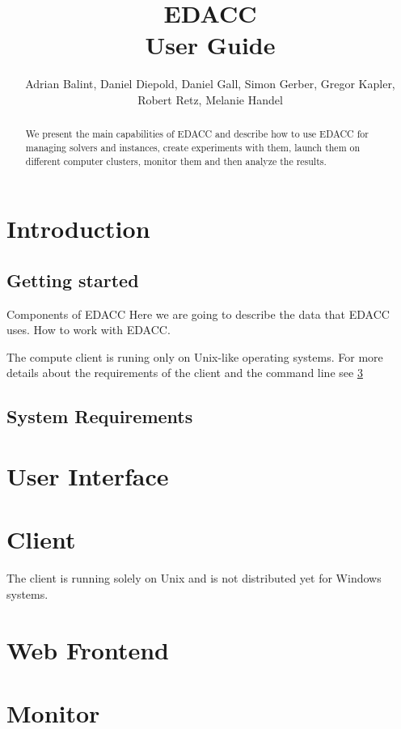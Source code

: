 \documentclass[twoside,a4paper]{refart}
\title{EDACC \\ %
User Guide	
}
\author{Adrian Balint, Daniel Diepold, Daniel Gall, Simon Gerber, Gregor Kapler, Robert Retz, Melanie Handel }
\date{}
\begin{document}
\maketitle

\begin{abstract}
        We present the main capabilities of EDACC and describe how to use EDACC for managing solvers and instances, create experiments with them, launch them on different computer clusters, monitor them and then analyze the results. 
\end{abstract}


\tableofcontents

\newpage



\section{Introduction}

\subsection{Getting started}
Components of EDACC
Here we are going to describe the data that EDACC uses.
How to work with EDACC.

The compute client is runing only on Unix-like operating systems. 
For more details  about the requirements of the client and the command line see \ref{client}



\subsection{System Requirements}
\section{User Interface}
\section{Client}
\label{client}
\attention The client is running solely on Unix and is not distributed yet for Windows systems.
\section{Web Frontend}
\section{Monitor}




\printindex
\end{document}
